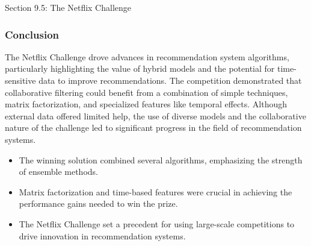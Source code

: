 \begin{notes}{Section 9.5: The Netflix Challenge}
    \subsubsection*{Conclusion}
    
    The Netflix Challenge drove advances in recommendation system algorithms, particularly highlighting the value of hybrid models and the potential for time-sensitive data to improve recommendations. The competition 
    demonstrated that collaborative filtering could benefit from a combination of simple techniques, matrix factorization, and specialized features like temporal effects. Although external data offered limited help, 
    the use of diverse models and the collaborative nature of the challenge led to significant progress in the field of recommendation systems.
    
    \begin{highlight}
        \begin{itemize}
            \item The winning solution combined several algorithms, emphasizing the strength of ensemble methods.
            \item Matrix factorization and time-based features were crucial in achieving the performance gains needed to win the prize.
            \item The Netflix Challenge set a precedent for using large-scale competitions to drive innovation in recommendation systems.
        \end{itemize}
    \end{highlight}
\end{notes}